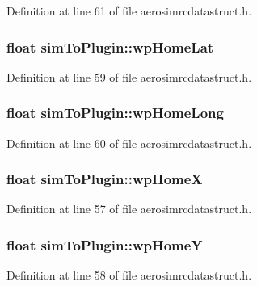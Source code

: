 \-Definition at line 61 of file aerosimrcdatastruct.\-h.

\hypertarget{group___aero_sim_r_c_ga5364e2cce6429762b9597145fc144130}{
\subsubsection[{wp\-Home\-Lat}]{\setlength{\rightskip}{0pt plus 5cm}float {\bf sim\-To\-Plugin\-::wp\-Home\-Lat}}}\label{group___aero_sim_r_c_ga5364e2cce6429762b9597145fc144130}


\-Definition at line 59 of file aerosimrcdatastruct.\-h.

\hypertarget{group___aero_sim_r_c_ga1a595cb81efdafe9ec21ef40211ad74e}{
\subsubsection[{wp\-Home\-Long}]{\setlength{\rightskip}{0pt plus 5cm}float {\bf sim\-To\-Plugin\-::wp\-Home\-Long}}}\label{group___aero_sim_r_c_ga1a595cb81efdafe9ec21ef40211ad74e}


\-Definition at line 60 of file aerosimrcdatastruct.\-h.

\hypertarget{group___aero_sim_r_c_gac7fe47d860d72f33b075d84a1794f039}{
\subsubsection[{wp\-Home\-X}]{\setlength{\rightskip}{0pt plus 5cm}float {\bf sim\-To\-Plugin\-::wp\-Home\-X}}}\label{group___aero_sim_r_c_gac7fe47d860d72f33b075d84a1794f039}


\-Definition at line 57 of file aerosimrcdatastruct.\-h.

\hypertarget{group___aero_sim_r_c_ga943c9583ab5e36a5c4b4eb92b34c3aa2}{
\subsubsection[{wp\-Home\-Y}]{\setlength{\rightskip}{0pt plus 5cm}float {\bf sim\-To\-Plugin\-::wp\-Home\-Y}}}\label{group___aero_sim_r_c_ga943c9583ab5e36a5c4b4eb92b34c3aa2}


\-Definition at line 58 of file aerosimrcdatastruct.\-h.

